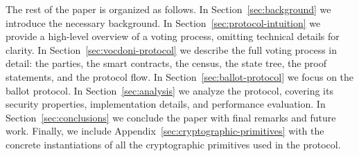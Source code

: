 The rest of the paper is organized as follows. In Section~\ref{sec:background} we introduce the necessary background. 
In Section~\ref{sec:protocol-intuition} we provide a high-level overview of a voting process, omitting technical details for clarity. In Section~\ref{sec:vocdoni-protocol} we describe the full voting process in detail: the parties, the smart contracts, the census, the state tree, the proof statements, and the protocol flow. In Section~\ref{sec:ballot-protocol} we focus on the ballot protocol. 
In Section~\ref{sec:analysis} we analyze the protocol, covering its security properties, implementation details, and performance evaluation. In Section~\ref{sec:conclusions} we conclude the paper with final remarks and future work. Finally, we include Appendix~\ref{sec:cryptographic-primitives} with the concrete instantiations of all the cryptographic primitives used in the protocol.
